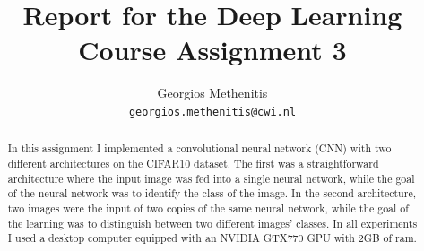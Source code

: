 \documentclass{article}
\title{Report for the Deep Learning Course Assignment 3}
\author{
  Georgios Methenitis \\
  \texttt{georgios.methenitis@cwi.nl}
}
\begin{document}
\maketitle

\begin{abstract}
In this assignment I implemented a convolutional neural network (CNN) with two different architectures on the CIFAR10 dataset.
The first was a straightforward architecture where the input image was fed into a single neural network, while the goal of the neural network was to identify the class of the image.
In the second architecture, two images were the input of two copies of the same neural network, while the goal of the learning was to distinguish between two different images' classes.
In all experiments I used a desktop computer equipped with an NVIDIA GTX770 GPU with 2GB of ram.

\end{abstract}
\end{document}
